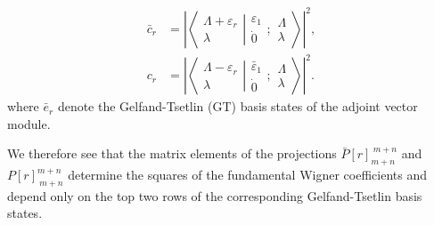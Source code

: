 \documentclass[12pt]{article}
\def\nn{\nonumber}
\begin{document}
\begin{align}
\bar{c}_r  &= \left| \left\langle\left. 
\begin{array}{c} \Lambda+\varepsilon_r\\ \lambda \end{array}
\right|\right.
\left.
\begin{array}{c} \varepsilon_1 \\
\dot{0} \end{array} 
;
 \begin{array}{c} \Lambda \\
\lambda \end{array}
\right\rangle \right|^2, \\
c_r &= \left| \left\langle\left. 
\begin{array}{c} \Lambda-\varepsilon_r\\ \lambda \end{array}
\right|\right.
\left.
\begin{array}{c} \bar{\varepsilon}_1 \\
\dot{0} \end{array}  ; \begin{array}{c} \Lambda \\
\lambda \end{array}
\right\rangle \nn \right|^2.
\end{align}
where $\bar{e}_r$ denote the Gelfand-Tsetlin (GT) basis states of the adjoint vector module.

We therefore see that the matrix elements of the projections $\bar{P}[r]_{m+n}^{\ m+n}$ and $P[r]_{\ m+n}^{m+n}$ determine
the squares of the fundamental Wigner coefficients and depend only on the top two rows of the corresponding Gelfand-Tsetlin basis states.

\end{document}
